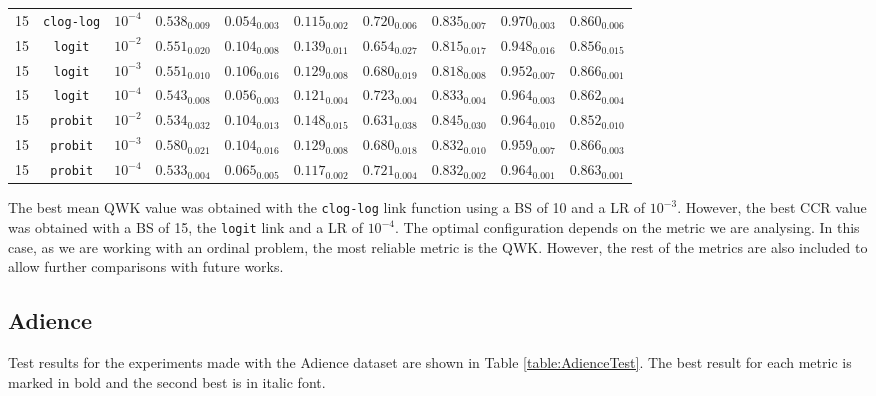 \documentclass[preprint]{elsarticle}
\begin{document}
\begin{table}[!t]
{\begin{tabular}{c@{\hskip 0.15cm}c@{\hskip 0.15cm}c@{\hskip 0.15cm}c@{\hskip 0.15cm}c@{\hskip 0.15cm}c@{\hskip 0.15cm}c@{\hskip 0.15cm}c@{\hskip 0.15cm}c@{\hskip 0.15cm}c}
		15 & \texttt{clog-log} & $10^{-4}$ & $0.538_{0.009}$ & $0.054_{0.003}$ & $\mathbf{0.115_{0.002}}$ & $0.720_{0.006}$ & $0.835_{0.007}$ & $0.970_{0.003}$ & $0.860_{0.006}$\\
		15 & \texttt{logit} & $10^{-2}$ & $0.551_{0.020}$ & $0.104_{0.008}$ & $0.139_{0.011}$ & $0.654_{0.027}$ & $0.815_{0.017}$ & $0.948_{0.016}$ & $0.856_{0.015}$\\
		15 & \texttt{logit} & $10^{-3}$ & $0.551_{0.010}$ & $0.106_{0.016}$ & $0.129_{0.008}$ & $0.680_{0.019}$ & $0.818_{0.008}$ & $0.952_{0.007}$ & $\mathit{0.866_{0.001}}$\\
		15 & \texttt{logit} & $10^{-4}$ & $0.543_{0.008}$ & $0.056_{0.003}$ & $0.121_{0.004}$ & $\mathbf{0.723_{0.004}}$ & $0.833_{0.004}$ & $0.964_{0.003}$ & $0.862_{0.004}$\\
		15 & \texttt{probit} & $10^{-2}$ & $0.534_{0.032}$ & $0.104_{0.013}$ & $0.148_{0.015}$ & $0.631_{0.038}$ & $0.845_{0.030}$ & $0.964_{0.010}$ & $0.852_{0.010}$\\
		15 & \texttt{probit} & $10^{-3}$ & $\mathit{0.580_{0.021}}$ & $0.104_{0.016}$ & $0.129_{0.008}$ & $0.680_{0.018}$ & $0.832_{0.010}$ & $0.959_{0.007}$ & $0.866_{0.003}$\\
		15 & \texttt{probit} & $10^{-4}$ & $0.533_{0.004}$ & $0.065_{0.005}$ & $0.117_{0.002}$ & $\mathit{0.721_{0.004}}$ & $0.832_{0.002}$ & $0.964_{0.001}$ & $0.863_{0.001}$\\
		\hline
		\hline
	\end{tabular}}
\end{table}

The best mean QWK value was obtained with the \texttt{clog-log} link function using a BS of 10 and a LR of $10^{-3}$. However, the best CCR value was obtained with a BS of 15, the \texttt{logit} link and a LR of $10^{-4}$. The optimal configuration depends on the metric we are analysing. In this case, as we are working with an ordinal problem, the most reliable metric is the QWK. However, the rest of the metrics are also included to allow further comparisons with future works.

\subsection{Adience}
\label{sect:adience}
Test results for the experiments made with the Adience dataset are shown in Table \ref{table:AdienceTest}. The best result for each metric is marked in bold and the second best is in italic font.
\end{document}
